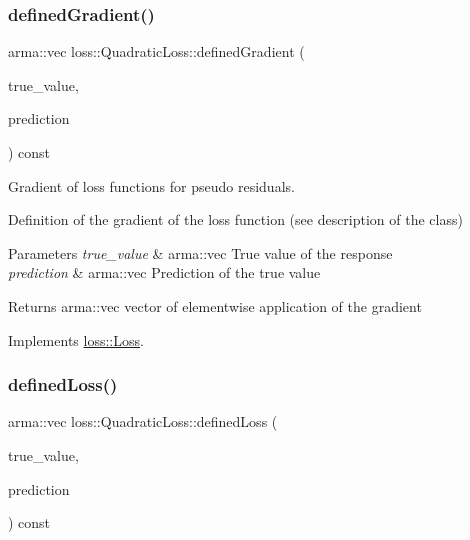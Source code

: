 \mbox{\label{classloss_1_1_quadratic_loss_adb4da1acbad702b5ba8570abaa17d373}} 
\subsubsection{\texorpdfstring{defined\+Gradient()}{definedGradient()}}
{\footnotesize\ttfamily arma\+::vec loss\+::\+Quadratic\+Loss\+::defined\+Gradient (\begin{DoxyParamCaption}\item[{const arma\+::vec \&}]{true\+\_\+value,  }\item[{const arma\+::vec \&}]{prediction }\end{DoxyParamCaption}) const\hspace{0.3cm}{\ttfamily [virtual]}}



Gradient of loss functions for pseudo residuals. 

Definition of the gradient of the loss function (see description of the class)


\begin{DoxyParams}{Parameters}
{\em true\+\_\+value} & {\ttfamily arma\+::vec} True value of the response \\
\hline
{\em prediction} & {\ttfamily arma\+::vec} Prediction of the true value\\
\hline
\end{DoxyParams}
\begin{DoxyReturn}{Returns}
{\ttfamily arma\+::vec} vector of elementwise application of the gradient 
\end{DoxyReturn}


Implements \mbox{\hyperlink{classloss_1_1_loss_a267a4de70747ade4b2d84ce35a448979}{loss\+::\+Loss}}.

\mbox{\label{classloss_1_1_quadratic_loss_ae34f68243ffe021e309ed73a68796e1e}} 
\subsubsection{\texorpdfstring{defined\+Loss()}{definedLoss()}}
{\footnotesize\ttfamily arma\+::vec loss\+::\+Quadratic\+Loss\+::defined\+Loss (\begin{DoxyParamCaption}\item[{const arma\+::vec \&}]{true\+\_\+value,  }\item[{const arma\+::vec \&}]{prediction }\end{DoxyParamCaption}) const\hspace{0.3cm}{\ttfamily [virtual]}}



